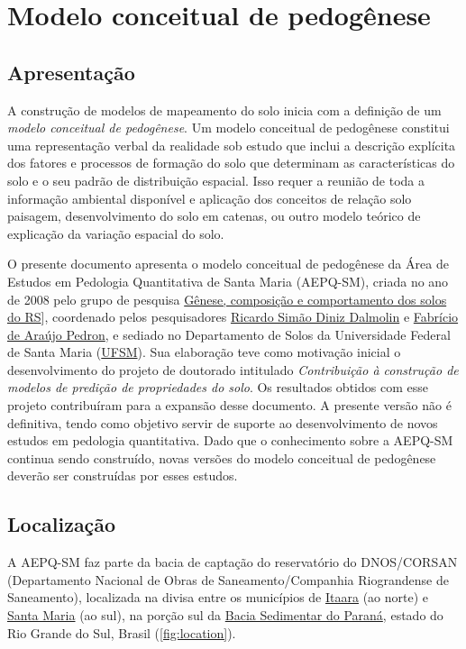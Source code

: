 \artigofalse
\chapter{Modelo conceitual de pedogênese}
\label{apen:pedogenesis}

\tocless\section{Apresentação}

A construção de modelos de mapeamento do solo inicia com a definição de um \textit{modelo conceitual
de pedogênese}. Um modelo conceitual de pedogênese constitui uma representação verbal da realidade 
sob estudo que inclui a descrição explícita dos fatores e processos de formação do solo que 
determinam as características do solo e o seu padrão de distribuição espacial. Isso requer a reunião
de toda a informação ambiental disponível e aplicação dos conceitos de relação solo paisagem, 
desenvolvimento do solo em catenas, ou outro modelo teórico de explicação da variação espacial do 
solo.

O presente documento apresenta o modelo conceitual de pedogênese da Área de Estudos em Pedologia 
Quantitativa de Santa Maria (AEPQ-SM), criada no ano de 2008 pelo grupo de pesquisa 
\href{dgp.cnpq.br/dgp/espelhogrupo/9373361709890764}{Gênese, composição e comportamento dos solos do
RS}], coordenado pelos pesquisadores \href{http://lattes.cnpq.br/3735884911693854}{Ricardo Simão 
Diniz Dalmolin} e \href{http://lattes.cnpq.br/6868334304493274}{Fabrício de Araújo Pedron}, e 
sediado no Departamento de Solos da Universidade Federal de Santa Maria 
(\href{http://site.ufsm.br/}{UFSM}). Sua elaboração teve como motivação inicial o desenvolvimento do
projeto de doutorado intitulado \textit{Contribuição à construção de modelos de predição de 
propriedades do solo}. Os resultados obtidos com esse projeto contribuíram para a expansão desse 
documento. A presente versão não é definitiva, tendo como objetivo servir de suporte ao 
desenvolvimento de novos estudos em pedologia quantitativa. Dado que o conhecimento sobre a AEPQ-SM 
continua sendo construído, novas versões do modelo conceitual de pedogênese deverão ser construídas 
por esses estudos.

\tocless\section{Localização}

A AEPQ-SM faz parte da bacia de captação do reservatório do DNOS/CORSAN (Departamento Nacional de 
Obras de Saneamento/Companhia Riograndense de Saneamento), localizada na divisa entre os municípios 
de \href{http://pt.wikipedia.org/wiki/Itaara}{Itaara} (ao norte) e 
\href{http://pt.wikipedia.org/wiki/Santa_Maria_\%28Rio_Grande_do_Sul\%29}{Santa Maria} (ao sul), na 
porção sul da \href{http://pt.wikipedia.org/wiki/Bacia_do_Paran\%C3\%A1}{Bacia Sedimentar do Paraná},
estado do Rio Grande do Sul, Brasil (\autoref{fig:location}).

